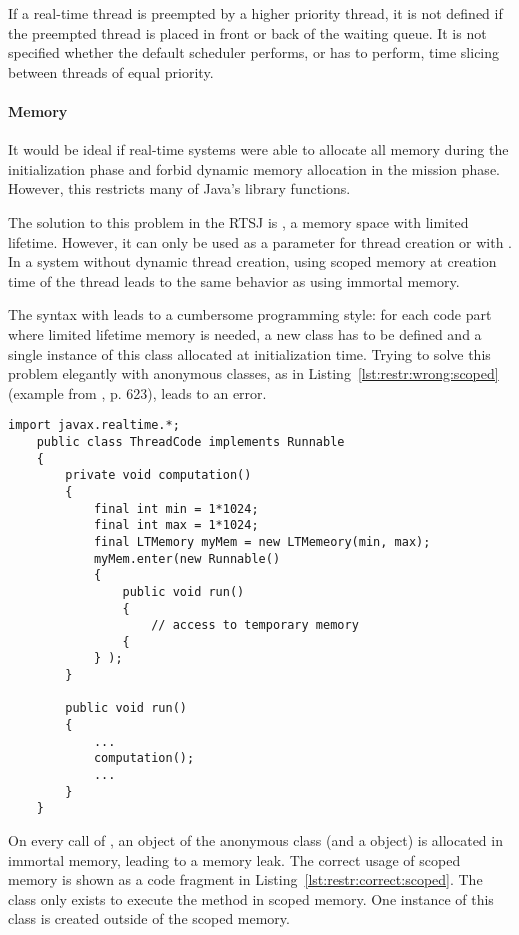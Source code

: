 If a real-time thread is preempted by a higher priority thread, it
is not defined if the preempted thread is placed in front or back of
the waiting queue. It is not specified whether the default scheduler
performs, or has to perform, time slicing between
threads of equal priority.

\paragraph{Memory}


It would be ideal if real-time systems were able to allocate all
memory during the initialization phase and forbid dynamic memory
allocation in the mission phase. However, this restricts many of
Java's library functions.


The solution to this problem in the RTSJ is , a
memory space with limited lifetime. However, it can only be used as
a parameter for thread creation or with . In
a system without dynamic thread creation, using scoped memory at
creation time of the thread leads to the same behavior as using
immortal memory.

The syntax with  leads to a cumbersome programming
style: for each code part where limited lifetime memory is needed, a
new class has to be defined and a single instance of this class
allocated at initialization time. Trying to solve this problem
elegantly with anonymous classes, as in
Listing~\ref{lst:restr:wrong:scoped} (example from \cite{558498}, p.
623), leads to an error.

\begin{lstlisting}[float,caption={Scoped memory usage with a memory leak},label=lst:restr:wrong:scoped]
    import javax.realtime.*;
    public class ThreadCode implements Runnable
    {
        private void computation()
        {
            final int min = 1*1024;
            final int max = 1*1024;
            final LTMemory myMem = new LTMemeory(min, max);
            myMem.enter(new Runnable()
            {
                public void run()
                {
                    // access to temporary memory
                {
            } );
        }

        public void run()
        {
            ...
            computation();
            ...
        }
    }
\end{lstlisting}


On every call of , an object of the anonymous
class (and a  object) is allocated in immortal
memory, leading to a memory leak. The correct usage of scoped memory
is shown as a code fragment in
Listing~\ref{lst:restr:correct:scoped}. The class  only
exists to execute the method  in scoped memory. One
instance of this class is created outside of the scoped memory.

